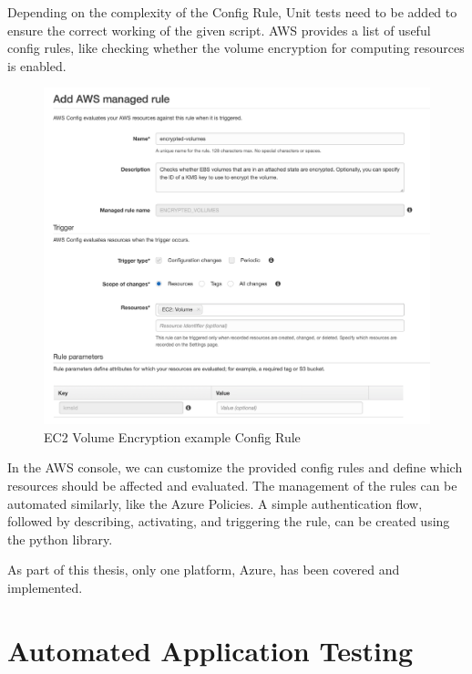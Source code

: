 \newpage

Depending on the complexity of the Config Rule, Unit tests need to be added to ensure the correct working of the given script. AWS provides a list of useful config rules, like checking whether the volume encryption for computing resources is enabled. 

\begin{figure}[ht!]
\begin{center}
\includegraphics[width=15cm]{aws_config_rule_example.png}
\end{center}
\caption[EC2 Volume Encryption example Config Rule]{EC2 Volume Encryption example Config Rule}
\end{figure}

In the AWS console, we can customize the provided config rules and define which resources should be affected and evaluated.
The management of the rules can be automated similarly, like the Azure Policies. A simple authentication flow, followed by describing, activating, and triggering the rule, can be created using the  python library.

As part of this thesis, only one platform, Azure, has been covered and implemented.


\section{Automated Application Testing}

